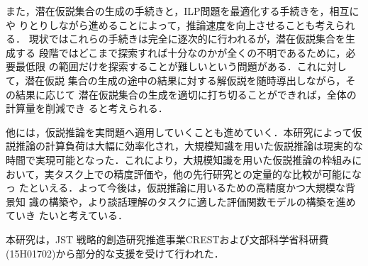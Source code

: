 \documentclass[japanese]{jnlp_1.4}
\begin{document}
また，潜在仮説集合の生成の手続きと，ILP問題を最適化する手続きを，相互にや
りとりしながら進めることによって，推論速度を向上させることも考えられる．
現状ではこれらの手続きは完全に逐次的に行われるが，潜在仮説集合を生成する
段階ではどこまで探索すれば十分なのかが全くの不明であるために，必要最低限
の範囲だけを探索することが難しいという問題がある．これに対して，潜在仮説
集合の生成の途中の結果に対する解仮説を随時導出しながら，その結果に応じて
潜在仮説集合の生成を適切に打ち切ることができれば，全体の計算量を削減でき
ると考えられる．

他には，仮説推論を実問題へ適用していくことも進めていく．本研究によって仮
説推論の計算負荷は大幅に効率化され，大規模知識を用いた仮説推論は現実的な
時間で実現可能となった．これにより，大規模知識を用いた仮説推論の枠組みに
おいて，実タスク上での精度評価や，他の先行研究との定量的な比較が可能になっ
たといえる．よって今後は，仮説推論に用いるための高精度かつ大規模な背景知
識の構築や，より談話理解のタスクに適した評価関数モデルの構築を進めていき
たいと考えている．



\acknowledgment

本研究は，JST 戦略的創造研究推進事業CRESTおよび文部科学省科研費
(15H01702)から部分的な支援を受けて行われた．
\end{document}
